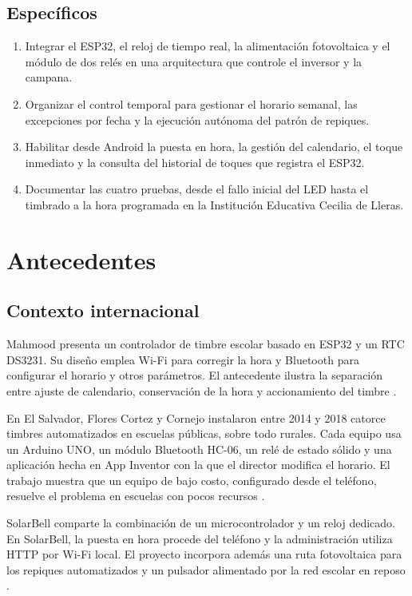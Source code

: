 \documentclass[a4paper,11pt]{article}
\begin{document}
\subsection{Específicos}
\begin{enumerate}
  \item Integrar el ESP32, el reloj de tiempo real, la alimentación fotovoltaica y el módulo de dos relés en una arquitectura que controle el inversor y la campana.
  \item Organizar el control temporal para gestionar el horario semanal, las excepciones por fecha y la ejecución autónoma del patrón de repiques.
  \item Habilitar desde Android la puesta en hora, la gestión del calendario, el toque inmediato y la consulta del historial de toques que registra el ESP32.
  \item Documentar las cuatro pruebas, desde el fallo inicial del LED hasta el timbrado a la hora programada en la Institución Educativa Cecilia de Lleras.
\end{enumerate}

\clearpage
\section{Antecedentes}
\subsection{Contexto internacional}
Mahmood presenta un controlador de timbre escolar basado en ESP32 y un RTC DS3231. Su diseño emplea Wi-Fi para corregir la hora y Bluetooth para configurar el horario y otros parámetros. El antecedente ilustra la separación entre ajuste de calendario, conservación de la hora y accionamiento del timbre \cite{mahmood}.

En El Salvador, Flores Cortez y Cornejo instalaron entre 2014 y 2018 catorce timbres automatizados en escuelas públicas, sobre todo rurales. Cada equipo usa un Arduino UNO, un módulo Bluetooth HC-06, un relé de estado sólido y una aplicación hecha en App Inventor con la que el director modifica el horario. El trabajo muestra que un equipo de bajo costo, configurado desde el teléfono, resuelve el problema en escuelas con pocos recursos \cite{flores}.

SolarBell comparte la combinación de un microcontrolador y un reloj dedicado. En SolarBell, la puesta en hora procede del teléfono y la administración utiliza HTTP por Wi-Fi local. El proyecto incorpora además una ruta fotovoltaica para los repiques automatizados y un pulsador alimentado por la red escolar en reposo \cite{ficha,diagrama}.
\end{document}
